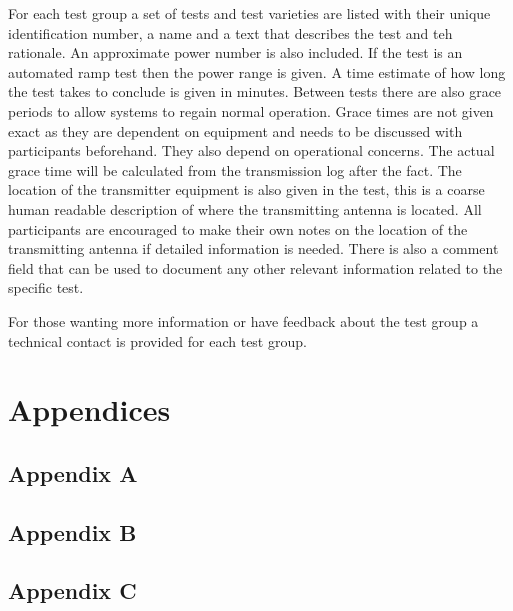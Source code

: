 \documentclass[a4paper]{book}
\begin{document}
For each test group a set of tests and test varieties are listed with their unique identification number, a name and a text that describes the test and teh rationale. An approximate power number is also included. If the test is an automated ramp test then the power range is given. A time estimate of how long the test takes to conclude is given in minutes. Between tests there are also grace periods to allow systems to regain normal operation. Grace  times are not given exact as they are dependent on equipment and needs to be discussed with participants beforehand. They also depend on operational concerns. The actual grace time will be calculated from the transmission log after the fact. The location of the transmitter equipment is also given in the test, this is a coarse human readable description of where the transmitting antenna is located. All participants are encouraged to make their own notes on the location of the transmitting antenna if detailed information is needed. There is also a comment field that can be used to document any other relevant information related to the specific test. \newline

For those wanting more information or have feedback about the test group a technical contact is provided for each test group. 




\chapter{Appendices}
\section{Appendix A}


\section{Appendix B}


\section{Appendix C}

\end{document}

